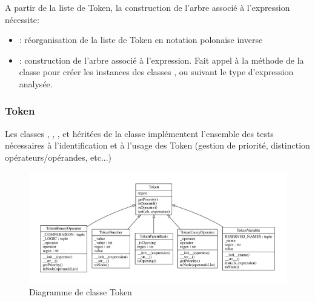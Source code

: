 A partir de la liste de Token, la construction de l'arbre associé à l'expression nécessite:
\begin{itemize}
	\item {}: réorganisation de la liste de Token en notation polonaise inverse
	
	\begin{center}
	\end{center}
\item {}: construction de l'arbre associé à l'expression. Fait appel à la méthode  de la classe  pour créer les instances des classes ,  ou  suivant le type d'expression analysée.
\end{itemize}

\subsubsection{Token}
Les classes , , ,  et  héritées de la classe  implémentent l'ensemble des tests nécessaires à l'identification et à l'usage des Token (gestion de priorité, distinction opérateurs/opérandes, etc...) 

\begin{figure}[h!]
	\centering
	\includegraphics[width = 20cm]{./Pictures/Token.pdf}
	\caption{\label{fig:class_Token} Diagramme de classe Token}
\end{figure}